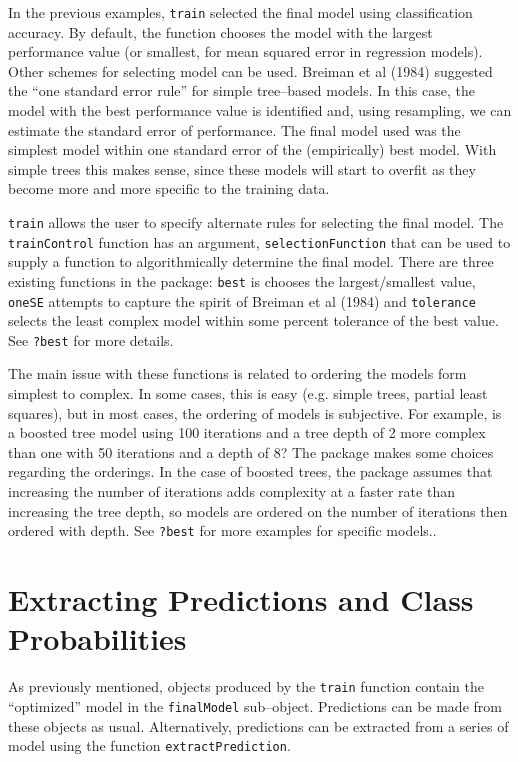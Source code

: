 \documentclass[12pt]{article}
\begin{document}
In the previous examples, \texttt{train} selected the final model using classification accuracy. By default, the function chooses the model with the largest performance value (or smallest, for mean squared error in regression models). Other schemes for selecting model can be used.  Breiman et al (1984) suggested the ``one standard error rule'' for simple tree--based models. In this case, the model with the best performance value is identified and, using resampling, we can estimate the standard error of performance. The final model used was the simplest model within one standard error of the (empirically) best model. With simple trees this makes sense, since these models will start to overfit as they become more and more specific to the training data.

\texttt{train} allows the user to specify alternate rules for selecting the final model. The \texttt{trainControl} function has an argument, \texttt{selectionFunction} that can be used to supply a function to algorithmically determine the final model. There are three existing functions in the package: \texttt{best} is chooses the largest/smallest value, \texttt{oneSE} attempts to capture the spirit of Breiman et al (1984) and \texttt{tolerance} selects the least complex model within some percent tolerance of the best value. See \texttt{?best} for more details.

The main issue with these functions is related to ordering the models form simplest to complex. In some cases, this is easy (e.g. simple trees, partial least squares), but in most cases, the ordering of models is subjective. For example, is a boosted tree model using 100 iterations and a tree depth of 2 more complex than one with 50 iterations and a depth of 8? The package makes some choices regarding the orderings. In the case of boosted trees, the package assumes that increasing the number of iterations adds complexity at a faster rate than increasing the tree depth, so models are ordered on the number of iterations then ordered with depth. See \texttt{?best} for more examples for specific models..


\section{Extracting Predictions and Class Probabilities}

As previously mentioned, objects produced by the \texttt{train} function contain the ``optimized'' model in the \texttt{finalModel} sub--object. Predictions can be made from these objects as usual. Alternatively, predictions can be extracted from a series of model using the function \texttt{extractPrediction}.
\end{document}
